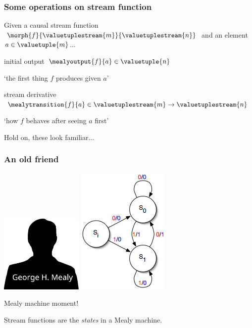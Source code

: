 \begin{frame}
    \frametitle{Some operations on stream function}

    Given a causal stream function \(
        \morph{f}{\valuetuplestream{m}}{\valuetuplestream{n}}
    \) and an element \(a \in \valuetuple{m}\)...

    \pause

    \Large
    \alert{initial output} \quad
    \(\mealyoutput{f}{a} \in \valuetuple{n}\)

    \pause

    \normalsize
    `the first thing \(f\) produces given \(a\)'

    \pause

    \Large
    \alert{stream derivative} \quad
    \(\mealytransition{f}{a} \in \valuetuplestream{m} \to \valuetuplestream{n}\)

    \pause

    \normalsize
    `how \(f\) behaves after seeing \(a\) first'

    \vspace{1em}

    \pause
    Hold on, these look familiar...

\end{frame}
\begin{frame}
    \frametitle{An old friend}

    \Large

    \begin{center}
        \includegraphics[width=0.3\textwidth]{imgs/mealy}
        \quad
        \includegraphics[scale=0.5]{imgs/mealy-machine}

        Mealy machine moment!

        \pause

        \normalsize
        Stream functions are the \emph{states} in a Mealy machine.
    \end{center}

\end{frame}
